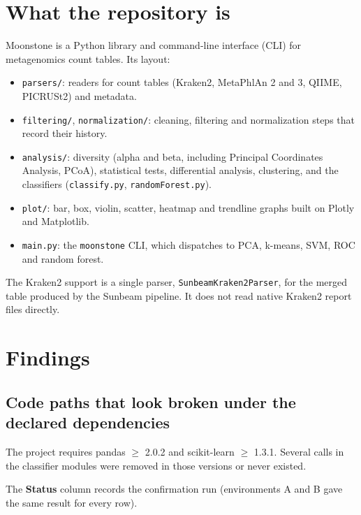 \documentclass[11pt,a4paper]{article}
\newcommand{\code}[1]{\texttt{\small #1}}
\begin{document}
\section{What the repository is}

Moonstone is a Python library and command-line interface (CLI) for metagenomics count tables. Its layout:

\begin{itemize}
  \item \code{parsers/}: readers for count tables (Kraken2, MetaPhlAn 2 and 3, QIIME, PICRUSt2) and metadata.
  \item \code{filtering/}, \code{normalization/}: cleaning, filtering and normalization steps that record their history.
  \item \code{analysis/}: diversity (alpha and beta, including Principal Coordinates Analysis, PCoA), statistical tests,
        differential analysis, clustering, and the classifiers (\code{classify.py}, \code{randomForest.py}).
  \item \code{plot/}: bar, box, violin, scatter, heatmap and trendline graphs built on Plotly and Matplotlib.
  \item \code{main.py}: the \code{moonstone} CLI, which dispatches to PCA, k-means, SVM, ROC and random forest.
\end{itemize}

The Kraken2 support is a single parser, \code{SunbeamKraken2Parser}, for the merged table produced by the Sunbeam
pipeline. It does not read native Kraken2 report files directly.

\section{Findings}

\subsection{Code paths that look broken under the declared dependencies}

The project requires pandas $\geq$ 2.0.2 and scikit-learn $\geq$ 1.3.1. Several calls in the classifier modules were
removed in those versions or never existed.

The \textbf{Status} column records the confirmation run (environments A and B gave the same result for every row).
\end{document}
